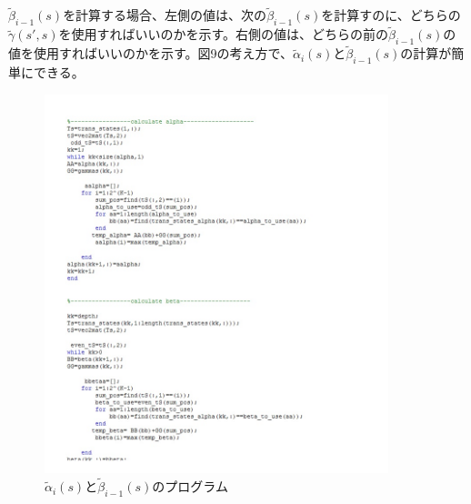 \documentclass[20 pts]{article}
\begin{document}
$\widetilde{\beta}_{i-1}(s)$を計算する場合、左側の値は、次の$\widetilde{\beta}_{i-1}(s)$を計算すのに、どちらの$\widetilde{\gamma}(s',s)$を使用すればいいのかを示す。右側の値は、どちらの前の$\widetilde{\beta}_{i-1}(s)$の値を使用すればいいのかを示す。図9の考え方で、$\widetilde{\alpha}_i(s)$と$\widetilde{\beta}_{i-1}(s)$の計算が簡単にできる。

\begin{figure}[h!]
\includegraphics[width=10cm]{zu9.jpg}
\caption{ $\widetilde{\alpha}_i(s)$と$\widetilde{\beta}_{i-1}(s)$のプログラム}
\label{図2}
\end{figure}
\end{document}
